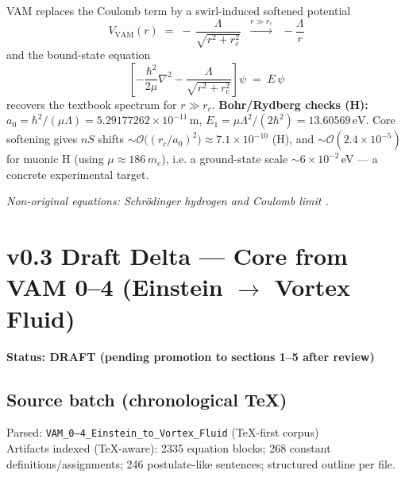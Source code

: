 \documentclass[11pt]{article}
\begin{document}
    VAM replaces the Coulomb term by a swirl-induced softened potential
    \[
        \boxed{ V_{\text{VAM}}(r) \;=\; -\,\frac{\Lambda}{\sqrt{r^2+r_c^2}}
        \;\;\xrightarrow{r\gg r_c}\;\; -\frac{\Lambda}{r} }
    \]
    and the bound-state equation
    \[
        \boxed{ \left[-\frac{\hbar^2}{2\mu}\nabla^2 - \frac{\Lambda}{\sqrt{r^2+r_c^2}}\right]\psi \;=\; E\,\psi }
    \]
    recovers the textbook spectrum for $r\gg r_c$.
    \textbf{Bohr/Rydberg checks (H):}
    $a_0=\hbar^2/(\mu\Lambda)=5.29177262\times10^{-11}\,\mathrm{m}$,
    $E_{1}=\mu\Lambda^2/(2\hbar^2)=13.60569\,\mathrm{eV}$.
    Core softening gives $nS$ shifts $\sim \mathcal{O}\!\big((r_c/a_0)^2\big)\approx 7.1\times10^{-10}$ (H), and
    $\sim \mathcal{O}(2.4\times10^{-5})$ for muonic H (using $\mu\approx 186\,m_e$),
    i.e. a ground-state scale $\sim 6\times10^{-2}$\,eV --- a concrete experimental target.

    \textit{Non-original equations: Schr\"odinger hydrogen and Coulomb limit \cite{Schrodinger1926,Jackson1999}.}







    \section{v0.3 Draft Delta --- Core from VAM 0--4 (Einstein $\rightarrow$ Vortex Fluid)}
    \textbf{Status: DRAFT (pending promotion to sections 1--5 after review)}

    \subsection{Source batch (chronological TeX)}
    Parsed: \texttt{VAM\_0--4\_Einstein\_to\_Vortex\_Fluid} (TeX-first corpus)\\
    Artifacts indexed (TeX-aware): 2335 equation blocks; 268 constant definitions/assignments; 246 postulate-like sentences; structured outline per file.
\end{document}
